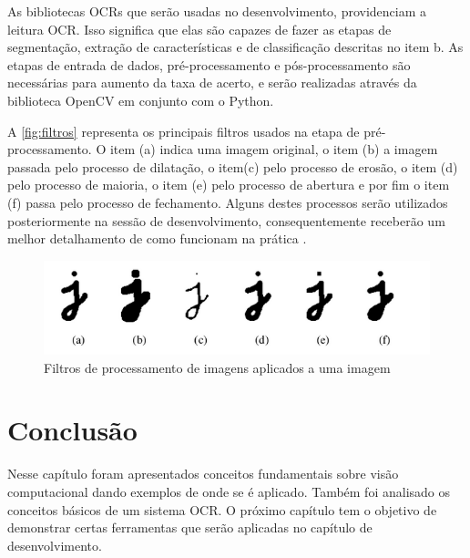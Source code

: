 As bibliotecas OCRs que serão usadas no desenvolvimento, providenciam a leitura OCR. Isso significa que elas são capazes de fazer as etapas de segmentação, extração de características e de classificação descritas no item b. As etapas de entrada de dados, pré-processamento e pós-processamento são necessárias para aumento da taxa de acerto, e serão realizadas através da biblioteca OpenCV em conjunto com o Python.

A \autoref{fig:filtros} representa os principais filtros usados na etapa de pré-processamento. O item (a) indica uma imagem original, o item (b) a imagem passada pelo processo de dilatação, o item(c) pelo processo de erosão, o item (d) pelo processo de maioria, o item (e) pelo processo de abertura e por fim o item (f) passa pelo processo de fechamento. Alguns destes processos serão utilizados posteriormente na sessão de desenvolvimento, consequentemente receberão um melhor detalhamento de como funcionam na prática \cite{caap}.

\begin{figure}[htbp]
\caption{\label{fig:filtros}Filtros de processamento de imagens aplicados a uma imagem}
\begin{center}
\includegraphics[width=.9\textwidth]{figuras/f4c2.png}
\end{center}
\end{figure}

\section{Conclusão}

Nesse capítulo foram apresentados conceitos fundamentais sobre visão computacional dando exemplos de onde se é aplicado. Também foi analisado os conceitos básicos de um sistema OCR. O próximo capítulo tem o objetivo de demonstrar certas ferramentas que serão aplicadas no capítulo de desenvolvimento.
